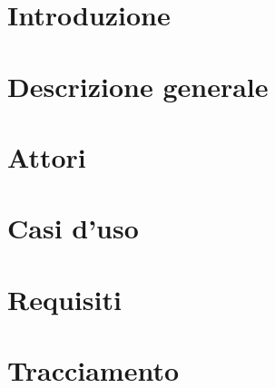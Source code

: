 \documentclass[a4paper, oneside, openany, dvipsnames, table]{article}
\begin{document}
\copertina{}



\newpage
\tableofcontents

\newpage
\listoftables

\newpage
\listoffigures

\newpage
\section{Introduzione}\label{sec:Introduzione}


\newpage
\section{Descrizione generale}\label{sec:Descrizione-generale}


\newpage
\section{Attori}\label{sec:Attori}


\section{Casi d'uso}\label{sec:casi-d-uso}


\newpage
\section{Requisiti}\label{sec:requisiti}


\newpage
\section{Tracciamento}\label{sec:tracciamento}

\end{document}
